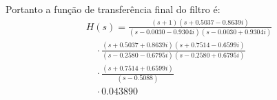 Portanto a função de transferência final do filtro é:
\begin{align*}
    H(s) = \frac{(s + 1)(s + 0.5037 - 0.8639i)}{(s - 0.0030 - 0.9304i)(s - 0.0030 + 0.9304i)}                     \\
    \quad \cdot \frac{(s + 0.5037 + 0.8639i)(s + 0.7514 - 0.6599i)}{(s - 0.2580 - 0.6795i)(s - 0.2580 + 0.6795i)} \\
    \quad \cdot \frac{(s + 0.7514 + 0.6599i)}{(s - 0.5088)}                                                       \\
    \quad \cdot 0.043890
\end{align*}
